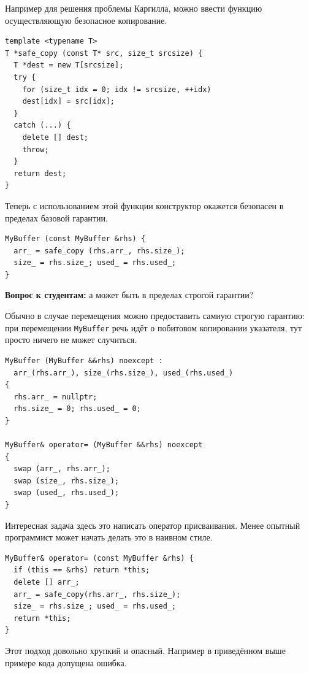 \documentclass[a4paper,12pt,oneside]{article}
\newif\ifanswers
\begin{document}
Например для решения проблемы Каргилла, можно ввести функцию осуществляющую безопасное копирование.

\begin{lstlisting}
template <typename T>
T *safe_copy (const T* src, size_t srcsize) {
  T *dest = new T[srcsize];
  try {
    for (size_t idx = 0; idx != srcsize, ++idx)
    dest[idx] = src[idx];
  }
  catch (...) {
    delete [] dest;
    throw;
  }
  return dest;
}
\end{lstlisting}

Теперь с использованием этой функции конструктор окажется безопасен в пределах базовой гарантии.

\begin{lstlisting}
MyBuffer (const MyBuffer &rhs) {
  arr_ = safe_copy (rhs.arr_, rhs.size_);
  size_ = rhs.size_; used_ = rhs.used_;
}
\end{lstlisting}

\textbf{Вопрос к студентам:} а может быть в пределах строгой гарантии?

\ifanswers
Правильный ответ: тут нет места транзакционности. Объект будет создан в согласованном но бесполезном состоянии.
\fi

Обычно в случае перемещения можно предоставить самиую строгую гарантию: при перемещении \lstinline!MyBuffer! речь идёт о побитовом копировании указателя, тут просто ничего не может случиться.

\begin{lstlisting}
MyBuffer (MyBuffer &&rhs) noexcept : 
  arr_(rhs.arr_), size_(rhs.size_), used_(rhs.used_) 
{
  rhs.arr_ = nullptr;
  rhs.size_ = 0; rhs.used_ = 0;
}

MyBuffer& operator= (MyBuffer &&rhs) noexcept 
{
  swap (arr_, rhs.arr_); 
  swap (size_, rhs.size_); 
  swap (used_, rhs.used_);
}
\end{lstlisting}

Интересная задача здесь это написать оператор присваивания. Менее опытный программист может начать делать это в наивном стиле.

\begin{lstlisting}
MyBuffer& operator= (const MyBuffer &rhs) {
  if (this == &rhs) return *this;
  delete [] arr_;
  arr_ = safe_copy(rhs.arr_, rhs.size_);
  size_ = rhs.size_; used_ = rhs.used_;
  return *this;
}
\end{lstlisting}

Этот подход довольно хрупкий и опасный. Например в приведённом выше примере кода допущена ошибка.
\end{document}
